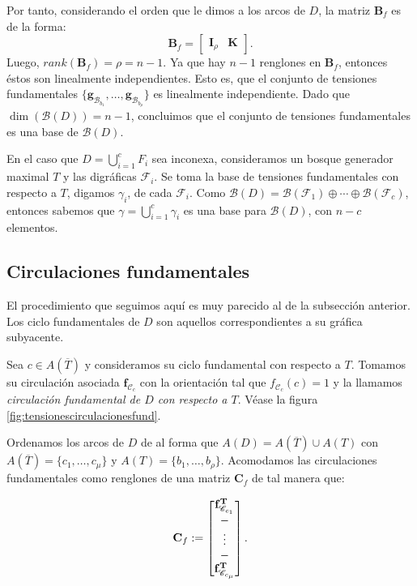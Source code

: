 Por tanto, considerando el orden que le dimos a los arcos de $D$, la matriz $\mathbf{B}_{f}$ es de la forma:
$$
\mathbf{B}_{f} = \begin{bmatrix}
\mathbf{I}_{\rho} & \mathbf{K} 
\end{bmatrix}.
$$
Luego, $rank(\mathbf{B}_{f}) = \rho = n-1$. Ya que hay $n -1$ renglones en $\mathbf{B}_{f}$, entonces éstos son linealmente independientes. Esto es, que el conjunto de tensiones fundamentales  $\{\mathbf{g}_{\mathscr{B}_{b_{1}}}, \ldots, \mathbf{g}_{\mathscr{B}_{b_{\rho}}} \}$ es linealmente independiente. Dado que $\dim(\mathcal{B}(D)) = n -1$, concluimos que el conjunto de tensiones fundamentales es una base de $\mathcal{B}(D)$.

En el caso que $D = \bigcup_{i = 1}^{c} F_{i}$ sea inconexa, consideramos  un bosque generador maximal $T$ y las digráficas $\mathcal{F}_{i}$. Se toma la base de tensiones fundamentales con respecto a $T$, digamos $\gamma_{i}$, de cada $\mathcal{F}_{i}$. Como $\mathcal{B}(D) = \mathcal{B}(\mathcal{F}_{1}) \oplus \cdots \oplus \mathcal{B}(\mathcal{F}_{c})$, entonces sabemos que $\gamma = \bigcup_{i =1}^{c}\gamma_{i}$ es una base para $\mathcal{B}(D)$, con $n - c$ elementos.


\subsection{Circulaciones fundamentales}
El procedimiento que seguimos aquí es muy parecido al de la subsección anterior. Los ciclo fundamentales de $D$ son aquellos correspondientes a su gráfica subyacente. 

Sea $c \in A(\overline{T})$ y consideramos su ciclo fundamental con respecto a $T$.  Tomamos su circulación asociada $\mathbf{f}_{\mathscr{C}_{c}}$ con la orientación tal que $f_{\mathscr{C}_{c}}(c)=1$ y la llamamos \textit{circulación fundamental de $D$ con respecto a $T$}. Véase la figura \ref{fig:tensionescirculacionesfund}.

Ordenamos los arcos de $D$ de al forma que $A(D) = A(\overline{T}) \cup A(T) $ con $A(\overline{T}) = \{c_{1}, \ldots, c_{\mu}\}$ y $A(T) = \{b_{1}, \ldots, b_{\rho}\}$. Acomodamos las circulaciones fundamentales como renglones de una matriz $\mathbf{C}_{f}$ de tal manera que:

$$
\mathbf{C}_{f} := \begin{bmatrix}
\mathbf{f}_{\mathscr{C}_{c_{1}}}^{\textbf{T}} \\
\-- \\
\vdots \\
\-- \\
\mathbf{f}_{\mathscr{C}_{c_{\mu}}}^{\textbf{T}}
\end{bmatrix}.
$$

